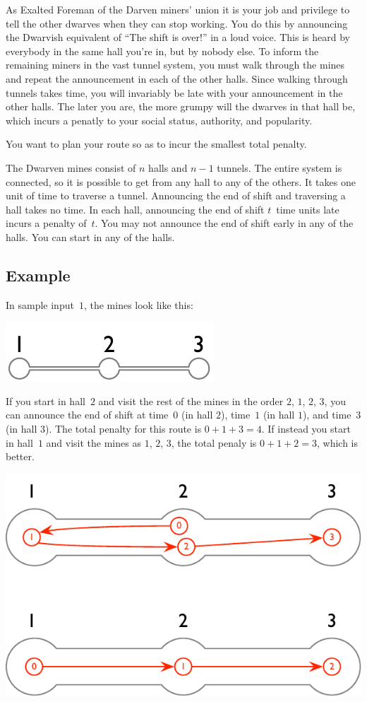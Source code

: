 
As Exalted Foreman of the Darven miners' union it is your job and privilege to tell the other dwarves when they can stop working.
You do this by announcing the Dwarvish equivalent of “The shift is over!” in a loud voice.
This is heard by everybody in the same hall you're in, but by nobody else.
To inform the remaining miners in the vast tunnel system, you must walk through the mines and repeat the announcement in each of the other halls.
Since walking through tunnels takes time,
you will invariably be late with your announcement in the other halls.
The later you are, the more grumpy will the dwarves in that hall be, which incurs a penatly to your social status, authority, and popularity.

You want to plan your route so as to incur the smallest total penalty. 

\midskip
The Dwarven mines consist of $n$ halls and $n-1$ tunnels.
The entire system is connected, so it is possible to get from any hall to any of the others.
It takes one unit of time to traverse a tunnel.
Announcing the end of shift and traversing a hall takes no time.
In each hall, announcing the end of shift $t$~time units late incurs a penalty of~$t$.
You may not announce the end of shift early in any of the halls.
You can start in any of the halls.

\subsection*{Example}

In sample input~$1$, the mines look like this:

\includegraphics[width=.15\textwidth]{img/sample-1.pdf}

If you start in hall~$2$ and visit the rest of the mines in the order $2$, $1$, $2$, $3$, you can announce the end of shift at time~$0$ (in hall $2$), time~$1$ (in hall $1$), and time~$3$ (in hall $3$).
The total penalty for this route is $0+1+3=4$.
If instead you start in hall~$1$ and visit the mines as $1$, $2$, $3$, the total penaly is $0+1+2=3$, which is better.

\includegraphics[width=.35\textwidth]{img/sample-1-ans.pdf}

